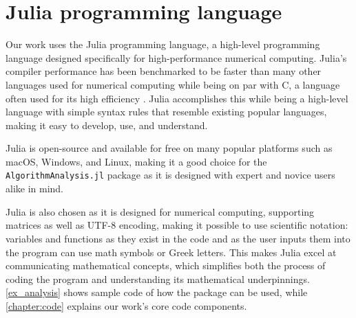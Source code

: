 \section{Julia programming language}

Our work uses the Julia programming language, a high-level programming language designed specifically for high-performance numerical computing. Julia's compiler performance has been benchmarked to be faster than many other languages used for numerical computing while being on par with C, a language often used for its high efficiency \cite{julia}. Julia accomplishes this while being a high-level language with simple syntax rules that resemble existing popular languages, making it easy to develop, use, and understand.

Julia is open-source and available for free on many popular platforms such as macOS, Windows, and Linux, making it a good choice for the \texttt{AlgorithmAnalysis.jl} package as it is designed with expert and novice users alike in mind.

Julia is also chosen as it is designed for numerical computing, supporting matrices as well as UTF-8 encoding, making it possible to use scientific notation: variables and functions as they exist in the code and as the user inputs them into the program can use math symbols or Greek letters. This makes Julia excel at communicating mathematical concepts, which simplifies both the process of coding the program and understanding its mathematical underpinnings. \cref{ex_analysis} shows sample code of how the package can be used, while \cref{chapter:code} explains our work's core code components.

